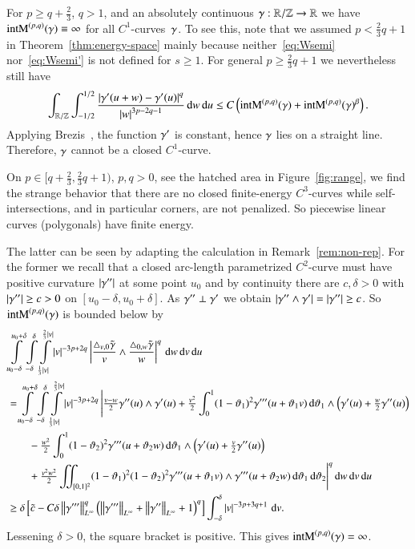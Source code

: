\begin{remark}\label{rem:singular}
 For $p\ge q+\tfrac23$, $q>1$, and an absolutely continuous $\g:\R/\Z\to\R$ we have
 $\E(\g)\equiv\infty$ for all $C^{1}$-curves~$\g$.
 To see this, note that we assumed $p<\frac23q+1$ in Theorem~\ref{thm:energy-space} mainly
because neither~\eqref{eq:Wsemi} nor~\eqref{eq:Wsemi'} is not defined for $s\ge1$.
For general $p\ge \frac23q+1$ we nevertheless still have
\begin{equation*}
 \int_{\R/\Z}\int_{-1/2}^{1/2} \frac{\abs{\dg(u+w)-\dg(u)}^q}{\abs{w}^{3p-2q-1}}\d w\d u
 \le C\br{\E(\g)+\E(\g)^{\beta}}.
\end{equation*}
 Applying Brezis~\cite[Prop.~2]{brezis}, the function $\dg$ is constant,
 hence $\g$ lies on a straight line. Therefore, $\g$ cannot be a closed
 $C^{1}$-curve.
\end{remark}


\begin{remark}[Strange energies for $p\in[q+\tfrac23,\tfrac23q+1)$]\label{rem:strange}
 On $p\in[q+\tfrac23,\tfrac23q+1)$, $p,q>0$, see the hatched area in Figure~\ref{fig:range},
 we find the strange behavior that there are no
 closed finite-energy $C^{3}$-curves
 while self-intersections, and in particular corners, are not penalized.
 So piecewise linear curves (polygonals) have finite energy.
 
 The latter can be seen by adapting the calculation
 in Remark~\ref{rem:non-rep}.
 For the former we recall that a closed
 arc-length parametrized $C^2$-curve must have
 positive curvature $\abs{\g''}$ at some point $u_{0}$ and by continuity
 there are $c,\delta>0$ with
 $\abs{\g''}\ge c>0$ on $[u_{0}-\delta,u_{0}+\delta]$.
 As $\g''\perp\dg$ we obtain $\abs{\g''\wedge\dg}=\abs{\g''}\ge c$.
 So $\E(\g)$ is bounded below by
 \begin{align*}
  &\int\limits_{u_{0}-\delta}^{u_{0}+\delta}
  \int\limits_{-\delta}^{\delta}
  \int\limits_{\frac13\abs v}^{\frac23\abs v}
  \abs v^{-3p+2q}\abs{\frac{\T v0}v\wedge\frac{\T 0w}w}^{q} \d w\d v\d u \\
  &=\int\limits_{u_{0}-\delta}^{u_{0}+\delta}
  \int\limits_{-\delta}^{\delta}
  \int\limits_{\frac13\abs v}^{\frac23\abs v}
  \abs v^{-3p+2q}\Bigg|\tfrac{v-w}2\g''(u)\wedge\dg(u)
  +\tfrac{v^{2}}2\int_{0}^{1}(1-\vth_{1})^{2}\g'''(u+\vth_{1}v)\d\vth_{1}\wedge\br{\dg(u)+\tfrac w2\g''(u)} \\
  &\qquad{}-\tfrac{w^{2}}2\int_{0}^{1}(1-\vth_{2})^{2}\g'''(u+\vth_{2}w)\d\vth_{1}\wedge\br{\dg(u)+\tfrac v2\g''(u)} \\
  &\qquad{}+\tfrac{v^{2}w^{2}}2\iint_{[0,1]^{2}}(1-\vth_{1})^{2}(1-\vth_{2})^{2}\g'''(u+\vth_{1}v)\wedge\g'''(u+\vth_{2}w)\d\vth_{1}\d\vth_{2}
  \Bigg|^{q} \d w\d v\d u \\
  &\ge \delta
  \bv{\tilde c-C\delta \lnorm[\infty]{\g'''}^{q}\br{\lnorm[\infty]{\g'''}+\lnorm[\infty]{\g''}+1}^{q}}
  \int_{-\delta}^{\delta}
  \abs v^{-3p+3q+1}\d v.
 \end{align*}
 Lessening $\delta>0$, the square bracket is positive.
 This gives $\E(\g)=\infty$.
\end{remark}


